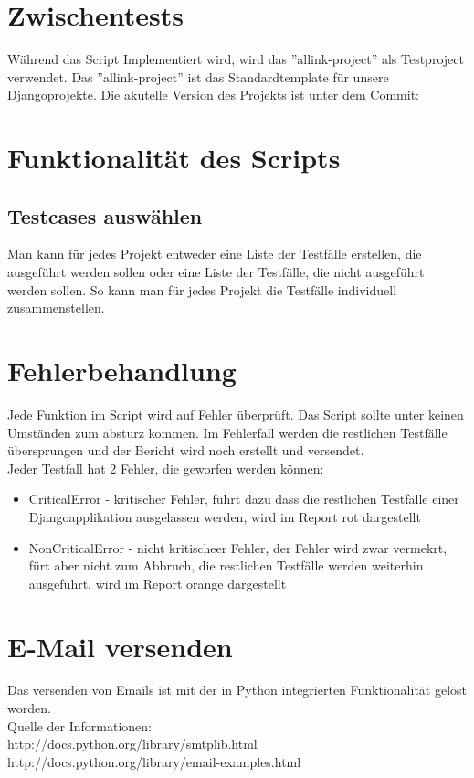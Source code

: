 \section{Zwischentests}
Während das Script Implementiert wird, wird das ''allink-project'' als Testproject verwendet. Das ''allink-project'' ist das Standardtemplate für unsere Djangoprojekte. Die akutelle Version des Projekts ist unter dem Commit: 

\section{Funktionalität des Scripts}
\subsection{Testcases auswählen}
Man kann für jedes Projekt entweder eine Liste der Testfälle erstellen, die ausgeführt werden sollen oder eine Liste der Testfälle, die nicht ausgeführt werden sollen.
So kann man für jedes Projekt die Testfälle individuell zusammenstellen.

\section{Fehlerbehandlung}
Jede Funktion im Script wird auf Fehler überprüft. Das Script sollte unter keinen Umständen zum absturz kommen. 
Im Fehlerfall werden die restlichen Testfälle übersprungen und der Bericht wird noch erstellt und versendet. \\
Jeder Testfall hat 2 Fehler, die geworfen werden können: 
\begin{itemize}
    \item CriticalError - kritischer Fehler, führt dazu dass die restlichen Testfälle einer Djangoapplikation ausgelassen werden, wird im Report rot dargestellt 
    \item NonCriticalError - nicht kritischeer Fehler, der Fehler wird zwar vermekrt, fürt aber nicht zum Abbruch, die restlichen Testfälle werden weiterhin ausgeführt, wird im Report orange dargestellt
\end{itemize}

\section{E-Mail versenden}
Das versenden von Emails ist mit der in Python integrierten Funktionalität gelöst worden. \\
Quelle der Informationen: \\ 
http://docs.python.org/library/smtplib.html \\
http://docs.python.org/library/email-examples.html \\

